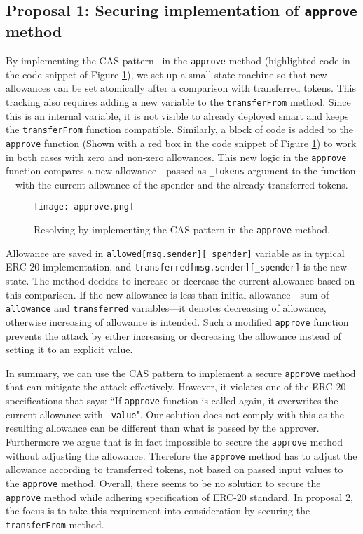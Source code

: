 \subsection{Proposal 1: Securing implementation of \texttt{approve} method}\label{subsec:prop1}
By implementing the CAS pattern~\cite{CompareSwap} in the \texttt{approve} method (highlighted code in the code snippet of Figure \ref{fig:approve}), we set up a small state machine so that new allowances can be set atomically after a comparison with transferred tokens. This tracking also requires adding a new variable to the \texttt{transferFrom} method. Since this is an internal variable, it is not visible to already deployed smart and keeps the \texttt{transferFrom} function compatible. Similarly, a block of code is added to the \texttt{approve} function (Shown with a red box in the code snippet of Figure \ref{fig:approve}) to work in both cases with zero and non-zero allowances. This new logic in the \texttt{approve} function compares a new allowance---passed as \texttt{\_tokens} argument to the function---with the current allowance of the spender and the already transferred tokens.

\begin{figure}[t]
	\centering
	\texttt{[image: approve.png]}
	\caption{Resolving \mwa by implementing the CAS pattern in the \texttt{approve} method.}
	\label{fig:approve}
\end{figure}

Allowance are saved in \texttt{allowed[msg.sender][\_spender]} variable as in typical ERC-20 implementation, and \texttt{transferred[msg.sender][\_spender]} is the new state. The method decides to increase or decrease the current allowance based on this comparison. If the new allowance is less than initial allowance---sum of \texttt{allowance} and \texttt{transferred} variables---it denotes decreasing of allowance, otherwise increasing of allowance is intended. Such a modified \texttt{approve} function prevents the attack by either increasing or decreasing the allowance instead of setting it to an explicit value. 

In summary, we can use the CAS pattern to implement a secure \texttt{approve} method that can mitigate the attack effectively. However, it violates one of the ERC-20 specifications that says: ``If \texttt{approve} function is called again, it overwrites the current allowance with \texttt{\_value}". Our solution does not comply with this as the resulting allowance can be different than what is passed by the approver. Furthermore we argue that is in fact impossible to secure the \texttt{approve} method without adjusting the allowance. Therefore the \texttt{approve} method has to adjust the allowance according to transferred tokens, not based on passed input values to the \texttt{approve} method. Overall, there seems to be no solution to secure the \texttt{approve} method while adhering specification of ERC-20 standard. In proposal 2, the focus is to take this requirement into consideration by securing the \texttt{transferFrom} method.

